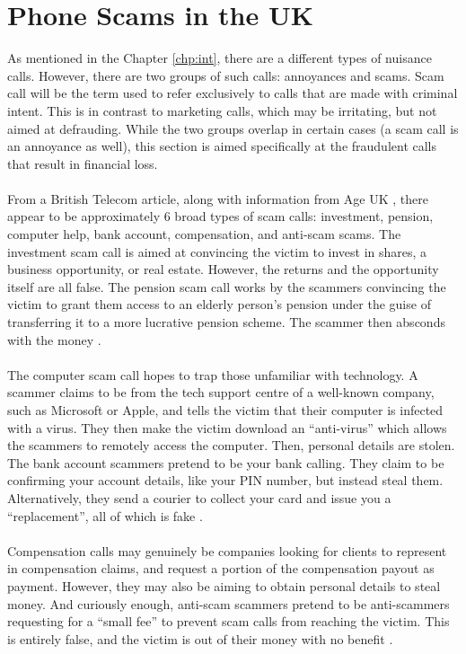 \documentclass[main.tex]{subfiles}
\begin{document}
\section{Phone Scams in the UK}\label{sec:scams}
As mentioned in the Chapter \ref{chp:int}, there are a different types of nuisance calls. However, there are two groups of such calls: annoyances and scams. Scam call will be the term used to refer exclusively to calls that are made with criminal intent. This is in contrast to marketing calls, which may be irritating, but not aimed at defrauding. While the two groups overlap in certain cases (a scam call is an annoyance as well), this section is aimed specifically at the fraudulent calls that result in financial loss.
\\\\
From a British Telecom \cite{bt-types} article, along with information from Age UK \cite{ageuk}, there appear to be approximately 6 broad types of scam calls: investment, pension, computer help, bank account, compensation, and anti-scam scams. The investment scam call is aimed at convincing the victim to invest in shares, a business opportunity, or real estate. However, the returns and the opportunity itself are all false. The pension scam call works by the scammers convincing the victim to grant them access to an elderly person's pension under the guise of transferring it to a more lucrative pension scheme. The scammer then absconds with the money \cite{bt-types}.
\\\\
The computer scam call hopes to trap those unfamiliar with technology. A scammer claims to be from the tech support centre of a well-known company, such as Microsoft or Apple, and tells the victim that their computer is infected with a virus. They then make the victim download an ``anti-virus'' which allows the scammers to remotely access the computer. Then, personal details are stolen. The bank account scammers pretend to be your bank calling. They claim to be confirming your account details, like your PIN number, but instead steal them. Alternatively, they send a courier to collect your card and issue you a ``replacement'', all of which is fake \cite{bt-types}.
\\\\
Compensation calls may genuinely be companies looking for clients to represent in compensation claims, and request a portion of the compensation payout as payment. However, they may also be aiming to obtain personal details to steal money. And curiously enough, anti-scam scammers pretend to be anti-scammers requesting for a ``small fee'' to prevent scam calls from reaching the victim. This is entirely false, and the victim is out of their money with no benefit \cite{ageuk}.
\end{document}

